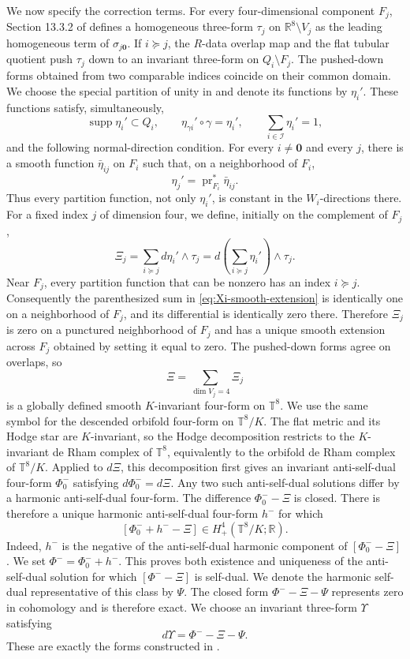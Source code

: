 \documentclass[11pt]{article}
\theoremstyle{remark}\newtheorem{remark}[theorem]{Remark}
\newcommand{\T}{\mathbb T}
\newcommand{\R}{\mathbb R}
\begin{document}
We now specify the correction terms.  For every four-dimensional
component $F_j$, Section 13.3.2 of \cite{JoyceBook} defines a homogeneous
three-form $\tau_j$ on $\R^8\setminus V_j$ as the leading homogeneous
term of $\sigma_{j\mathbf 0}$.  If $i\succeq j$, the $R$-data overlap map and the
flat tubular quotient push $\tau_j$ down to an invariant three-form on
$Q_i\setminus F_j$.  The pushed-down forms obtained from two comparable
indices coincide on their common domain.  We choose the special partition
of unity in \cite[Definition 13.2.6]{JoyceBook} and denote its functions
by $\eta_i'$.  These functions satisfy, simultaneously,
\[
 \operatorname{supp}\eta_i'\subset Q_i,\qquad
 \eta_{\gamma i}'\circ\gamma=\eta_i',\qquad
 \sum_{i\in\mathcal I}\eta_i'=1,
\]
and the following normal-direction condition.  For every
$i\ne\mathbf 0$ and
every $j$, there is a smooth function $\bar\eta_{ij}$ on $F_i$ such that,
on a neighborhood of $F_i$,
\[
 \eta_j'=\operatorname{pr}_{F_i}^*\bar\eta_{ij}.
\]
Thus every partition function, not only $\eta_i'$, is constant in the
$W_i$-directions there.  For a fixed index $j$ of dimension four, we
define, initially on the complement of $F_j$,
\begin{equation}\label{eq:Xi-smooth-extension}
 \Xi_j=\sum_{i\succeq j}d\eta_i'\wedge\tau_j
 =d\!\left(\sum_{i\succeq j}\eta_i'\right)\wedge\tau_j.
\end{equation}
Near $F_j$, every partition function that can be nonzero has an index
$i\succeq j$.  Consequently the parenthesized sum in
\eqref{eq:Xi-smooth-extension} is identically one on a neighborhood of
$F_j$, and its differential is identically zero there.  Therefore
$\Xi_j$ is zero on a punctured neighborhood of $F_j$ and has a unique
smooth extension across $F_j$ obtained by setting it equal to zero.  The
pushed-down forms agree on overlaps, so
\[
 \Xi=\sum_{\dim V_j=4}\Xi_j
\]
is a globally defined smooth $K$-invariant four-form on $\T^8$.  We use
the same symbol for the descended orbifold four-form on $\T^8/K$.
The flat metric and its Hodge star are $K$-invariant, so the Hodge
decomposition restricts to the $K$-invariant de Rham complex of
$\T^8$, equivalently to the orbifold de Rham complex of $\T^8/K$.
Applied to $d\Xi$, this decomposition first gives an invariant
anti-self-dual four-form $\Phi^-_0$ satisfying
$d\Phi^-_0=d\Xi$.  Any two such anti-self-dual solutions differ by a
harmonic anti-self-dual four-form.  The difference $\Phi^-_0-\Xi$ is
closed.  There is therefore a unique harmonic anti-self-dual four-form
$h^-$ for which
\[
 [\Phi^-_0+h^- -\Xi]\in H^4_+(\T^8/K;\R).
\]
Indeed, $h^-$ is the negative of the anti-self-dual harmonic component
of $[\Phi^-_0-\Xi]$.  We set $\Phi^-=\Phi^-_0+h^-$.  This proves both
existence and uniqueness of the anti-self-dual solution for which
$[\Phi^--\Xi]$ is self-dual.  We denote the harmonic self-dual
representative of this class by $\Psi$.  The closed form
$\Phi^--\Xi-\Psi$ represents zero in cohomology and is therefore exact.
We choose an invariant three-form $\Upsilon$ satisfying
\begin{equation}\label{eq:Joyce-global-correction}
 d\Upsilon=\Phi^--\Xi-\Psi.
\end{equation}
These are exactly the forms constructed in
\cite[Section 13.3.3]{JoyceBook}.
\end{document}
